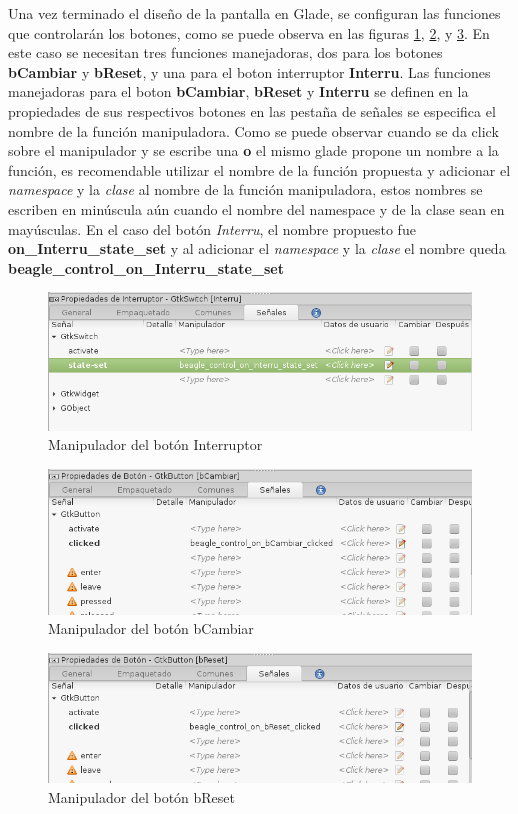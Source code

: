 \documentclass[12pt,twoside]{book}
\begin{document}
Una vez terminado el diseño de la pantalla en Glade, se configuran las funciones que controlarán los botones, como se puede observa en las figuras \ref{fig0021}, \ref{fig0022}, y \ref{fig0023}. En este caso se necesitan tres funciones manejadoras, dos para los botones \textbf{bCambiar} y \textbf{bReset}, y una para el boton interruptor \textbf{Interru}. Las funciones manejadoras para el boton \textbf{bCambiar}, \textbf{bReset} y   \textbf{Interru} se definen en la propiedades de sus respectivos botones en las pestaña de señales se especifica el nombre de la función manipuladora. Como se puede observar cuando se da click sobre el manipulador y se escribe una \textbf{o} el mismo glade propone un nombre a la función, es recomendable utilizar el nombre de la función propuesta y adicionar el \textit{namespace} y la \textit{clase} al nombre de la función manipuladora, estos nombres se escriben en minúscula aún cuando el nombre del namespace y de la clase sean en mayúsculas. En el caso del botón \emph{Interru}, el nombre propuesto fue \textbf{on\_Interru\_state\_set} y al adicionar el \textit{namespace} y la \textit{clase} el nombre queda \textbf{beagle\_control\_on\_Interru\_state\_set}

\begin{figure}
	\centering
	\includegraphics[width=0.8\linewidth]{Interru.png}
	\caption{Manipulador del botón Interruptor}
	\label{fig0021}
\end{figure}

\begin{figure}
	\centering
	\includegraphics[width=0.8\linewidth]{bCambiar.png}
	\caption{Manipulador del botón bCambiar}
	\label{fig0022}
\end{figure}

\begin{figure}
	\centering
	\includegraphics[width=0.8\linewidth]{bReset.png}
	\caption{Manipulador del botón bReset}
	\label{fig0023}
\end{figure}
\end{document}
